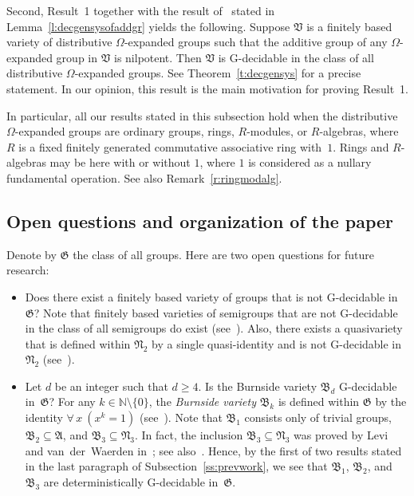 \documentclass{jgcc}
\newcommand{\cl}{\mathfrak}
\newcommand{\N}{\mathbb N}
\newcommand{\Forall}[1]{\forall\,#1\ }
\begin{document}
Second, Result~1 together with the result of~\cite{Ano02}
stated in Lemma~\ref{l:decgensysofaddgr} yields the
following. Suppose $\cl V$ is a finitely based variety of
distributive $\Omega$-expanded groups such that the additive
group of any $\Omega$-expanded group in $\cl V$ is
nilpotent. Then $\cl V$ is G-decidable in the class of all
distributive $\Omega$-expanded groups. See
Theorem~\ref{t:decgensys} for a precise statement. In our
opinion, this result is the main motivation for proving
Result~1.

In particular, all our results stated in this subsection
hold when the distributive $\Omega$-expanded groups are
ordinary groups, rings, $R$-modules, or $R$-algebras, where
$R$ is a fixed finitely generated commutative associative
ring with~$1$. Rings and $R$-algebras may be here with or
without $1$, where $1$ is considered as a nullary
fundamental operation. See also Remark~\ref{r:ringmodalg}.

\subsection{Open questions and organization of the paper}

Denote by $\cl G$ the class of all groups. Here are two open
questions for future research:
\begin{itemize}
\item Does there exist a finitely based variety of groups
that is not G-decidable in~$\cl G$? Note that finitely based
varieties of semigroups that are not G-decidable in the
class of all semigroups do exist
(see~\cite[Section~7]{Ano02}). Also, there exists a
quasivariety that is defined within $\cl N_2$ by a single
quasi-identity and is not G-decidable in $\cl N_2$
(see~\cite[Subsection~1.3]{Ano02}).

\item Let $d$ be an integer such that $d\ge4$. Is the
Burnside variety $\cl B_d$ G-decidable in~$\cl G$? For any
$k\in\N\setminus\{0\}$, the \emph{Burnside variety} $\cl
B_k$ is defined within $\cl G$ by the identity $\Forall
x(x^k=1)$ (see~\cite[14.63]{Neu67}). Note that $\cl B_1$
consists only of trivial groups, $\cl B_2\subseteq\cl A$,
and $\cl B_3\subseteq\cl N_3$. In fact, the inclusion $\cl
B_3\subseteq\cl N_3$ was proved by Levi and van~der~Waerden
in~\cite{LvdW33}; see also~\cite[12.3.5 and item~(iv)
of~12.3.6]{Rob96}. Hence, by the first of two results stated
in the last paragraph of Subsection~\ref{ss:prevwork}, we
see that $\cl B_1$, $\cl B_2$, and $\cl B_3$ are
deterministically G-decidable in~$\cl G$.
\end{itemize}
\end{document}
